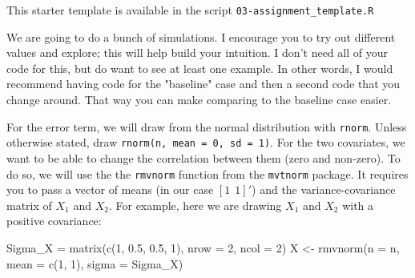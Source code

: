 \documentclass[12pt]{article}
\begin{document}
This starter template is available in the script \texttt{03-assignment\_template.R}

We are going to do a bunch of simulations. 
I encourage you to try out different values and explore; this will help build your intuition. 
I don't need all of your code for this, but do want to see at least one example.
In other words, I would recommend having code for the "baseline" case and then a second code that you change around. That way you can make comparing to the baseline case easier.

For the error term, we will draw from the normal distribution with \texttt{rnorm}. Unless otherwise stated, draw \texttt{rnorm(n, mean = 0, sd = 1)}. 
For the two covariates, we want to be able to change the correlation between them (zero and non-zero). 
To do so, we will use the the \texttt{rmvnorm} function from the \texttt{mvtnorm} package.
It requires you to pass a vector of means (in our case $[1 \ \ 1]'$) and the variance-covariance matrix of $X_1$ and $X_2$. 
For example, here we are drawing $X_1$ and $X_2$ with a positive covariance:
\begin{codeblock}
Sigma_X = matrix(c(1, 0.5, 0.5, 1), nrow = 2, ncol = 2)
X <- rmvnorm(n = n, mean = c(1, 1), sigma = Sigma_X)
\end{codeblock}
\end{document}

